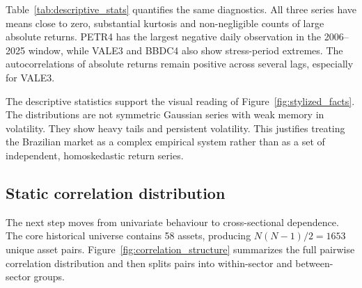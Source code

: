 Table~\ref{tab:descriptive_stats} quantifies the same diagnostics. All three series have means close to zero, substantial kurtosis and non-negligible counts of large absolute returns. PETR4 has the largest negative daily observation in the 2006--2025 window, while VALE3 and BBDC4 also show stress-period extremes. The autocorrelations of absolute returns remain positive across several lags, especially for VALE3.

\begin{table}
\centering
\caption{Descriptive statistics for the three demonstration assets, 2006--2025.}
\label{tab:descriptive_stats}
\end{table}
\FloatBarrier

The descriptive statistics support the visual reading of Figure~\ref{fig:stylized_facts}. The distributions are not symmetric Gaussian series with weak memory in volatility. They show heavy tails and persistent volatility. This justifies treating the Brazilian market as a complex empirical system rather than as a set of independent, homoskedastic return series.

\subsection{Static correlation distribution}

The next step moves from univariate behaviour to cross-sectional dependence. The core historical universe contains 58 assets, producing $N(N-1)/2=1653$ unique asset pairs. Figure~\ref{fig:correlation_structure} summarizes the full pairwise correlation distribution and then splits pairs into within-sector and between-sector groups.

